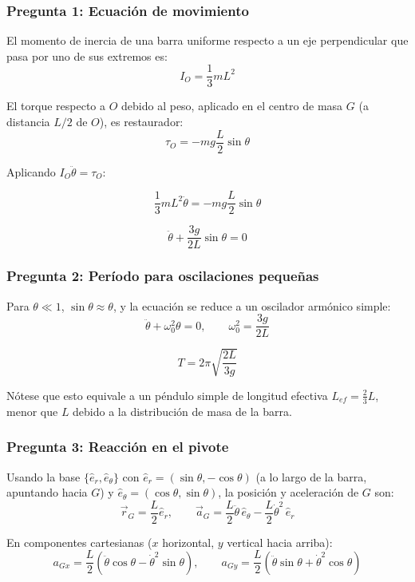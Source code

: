 \begin{sol}

\subsubsection*{Pregunta 1: Ecuación de movimiento}

El momento de inercia de una barra uniforme respecto a un eje perpendicular que pasa por uno de sus extremos es:
$$I_O = \frac{1}{3}mL^2$$

El torque respecto a $O$ debido al peso, aplicado en el centro de masa $G$ (a distancia $L/2$ de $O$), es restaurador:
$$\tau_O = -mg\frac{L}{2}\sin\theta$$

Aplicando $I_O\ddot{\theta} = \tau_O$:

$$\frac{1}{3}mL^2\ddot{\theta} = -mg\frac{L}{2}\sin\theta$$

$$\boxed{\ddot{\theta} + \frac{3g}{2L}\sin\theta = 0}$$

\subsubsection*{Pregunta 2: Período para oscilaciones pequeñas}

Para $\theta \ll 1$, $\sin\theta \approx \theta$, y la ecuación se reduce a un oscilador armónico simple:
$$\ddot{\theta} + \omega_0^2\theta = 0, \qquad \omega_0^2 = \frac{3g}{2L}$$

$$\boxed{T = 2\pi\sqrt{\frac{2L}{3g}}}$$

Nótese que esto equivale a un péndulo simple de longitud efectiva $L_{ef} = \frac{2}{3}L$, menor que $L$ debido a la distribución de masa de la barra.

\subsubsection*{Pregunta 3: Reacción en el pivote}

Usando la base $\{\hat{e}_r, \hat{e}_\theta\}$ con $\hat{e}_r = (\sin\theta, -\cos\theta)$ (a lo largo de la barra, apuntando hacia $G$) y $\hat{e}_\theta = (\cos\theta, \sin\theta)$, la posición y aceleración de $G$ son:
$$\vec{r}_G = \frac{L}{2}\hat{e}_r, \qquad \vec{a}_G = \frac{L}{2}\ddot{\theta}\,\hat{e}_\theta - \frac{L}{2}\dot{\theta}^2\,\hat{e}_r$$

En componentes cartesianas ($x$ horizontal, $y$ vertical hacia arriba):
$$a_{Gx} = \frac{L}{2}\left(\ddot{\theta}\cos\theta - \dot{\theta}^2\sin\theta\right), \qquad a_{Gy} = \frac{L}{2}\left(\ddot{\theta}\sin\theta + \dot{\theta}^2\cos\theta\right)$$


\end{sol}
